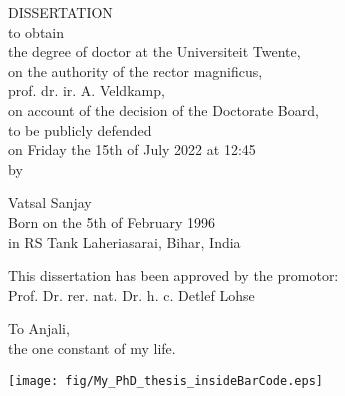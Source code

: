 \newpage
\thispagestyle{empty}
\vspace{1cm}
\begin{center}
{\Large \textsc{\thesistitle}}

\vspace{1cm}

DISSERTATION\\

\vspace{10mm}
to obtain\\
the degree of doctor at the Universiteit Twente,\\
on the authority of the rector magnificus,\\
prof. dr. ir. A. Veldkamp,\\
on account of the decision of the Doctorate Board,\\
to be publicly defended\\
on Friday the 15th of July 2022 at 12:45\\

\vspace{0.5cm}
by

\vspace{0.5cm}

Vatsal Sanjay\\
Born on the 5th of February 1996\\
in RS Tank Laheriasarai, Bihar, India\\

\newpage
\thispagestyle{empty}

This dissertation has been approved by the promotor:\\
\vspace{0.5cm}
Prof. Dr. rer. nat. Dr. h. c. Detlef Lohse

\newpage
\thispagestyle{empty}

To Anjali,\\
the one constant of my life.
\newpage
\thispagestyle{empty}

\texttt{[image: fig/My\_PhD\_thesis\_insideBarCode.eps]}
\end{center}